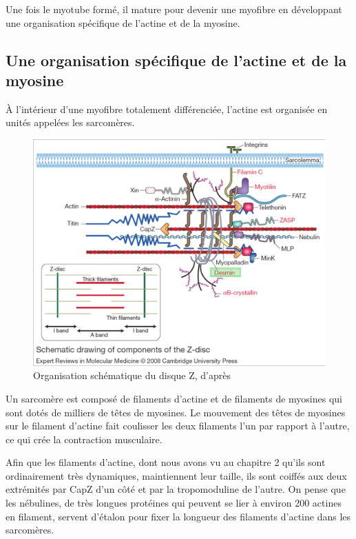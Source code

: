 Une fois le myotube formé, il mature pour devenir une myofibre en développant une organisation spécifique de l'actine et de la myosine.




\subsection{Une organisation spécifique de l'actine et de la myosine }

À l'intérieur d'une myofibre totalement différenciée, l'actine est organisée en unités appelées les sarcomères. 

\begin{figure}[p]
\includegraphics[scale=0.2]{Figures/sarcomere.png} 
\caption{Organisation schématique du disque Z, d'après \cite{ferrer_molecular_2008}}
\end{figure}

Un sarcomère est composé de filaments d'actine et de filaments de myosines qui sont dotés de milliers de têtes de myosines. Le mouvement des têtes de myosines sur le filament d'actine fait coulisser les deux filaments l'un par rapport à l'autre, ce qui crée la contraction musculaire. 

Afin que les filaments d'actine, dont nous avons vu au chapitre 2 qu'ils sont ordinairement très dynamiques, maintiennent leur taille, ils sont coiffés aux deux extrémités par CapZ d'un côté et par la tropomoduline de l'autre.
On pense que les nébulines, de très longues protéines qui peuvent se lier à environ 200 actines en filament, servent d'étalon pour fixer la longueur des filaments d'actine dans les sarcomères. 



